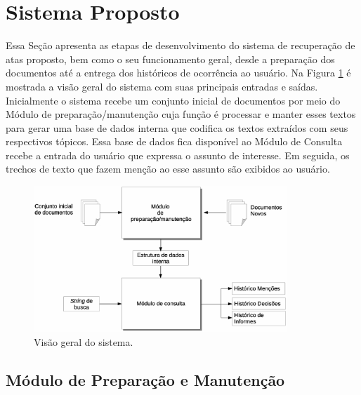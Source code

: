 \section{Sistema Proposto}
\label{sec:sistema-proposto}

Essa Seção apresenta as etapas de desenvolvimento do sistema de recuperação de atas proposto, bem como o seu funcionamento geral, desde a preparação dos documentos até a entrega dos históricos de ocorrência ao usuário. 
Na Figura \ref{fig:visao-geral} é mostrada a visão geral do sistema com suas principais entradas e saídas. Inicialmente o sistema recebe um conjunto inicial de documentos por meio do Módulo de preparação/manutenção cuja função é processar e manter esses textos para gerar uma base de dados interna que codifica os textos extraídos com seus respectivos tópicos. Essa base de dados fica disponível ao Módulo de Consulta recebe a entrada do usuário que expressa o assunto de interesse. Em seguida, os trechos de texto que fazem menção ao esse assunto são exibidos ao usuário.


  \begin{figure}[!h]
	  \centering
	  \includegraphics[width=0.85\textwidth]{conteudo/capitulos/figs/visao-geral-3.eps}
	  \caption{Visão geral do sistema.}
	  \label{fig:visao-geral}
  \end{figure}









\subsection{Módulo de Preparação e Manutenção}\label{sec:modulo-preparacao}

